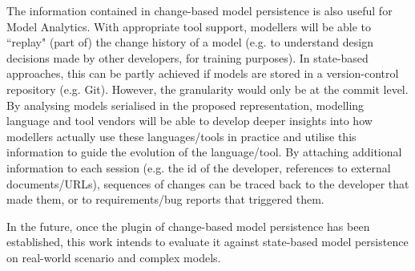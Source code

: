 The information contained in change-based model persistence is also useful for Model Analytics. With appropriate tool support, modellers will be able to ``replay" (part of) the change history of a model (e.g. to understand design decisions made by other developers, for training purposes). In state-based approaches, this can be partly achieved if models are stored in a version-control repository (e.g. Git). However, the granularity would only be at the commit level. By analysing models serialised in the proposed representation, modelling language and tool vendors will be able to develop deeper insights into how modellers actually use these languages/tools in practice and utilise this information to guide the evolution of the language/tool. By attaching additional information to each session (e.g. the id of the developer, references to external documents/URLs), sequences of changes can be traced back to the developer that made them, or to requirements/bug reports that triggered them.

In the future, once the plugin of change-based model persistence has been established, this work intends to evaluate it against state-based model persistence on real-world scenario and complex models.

